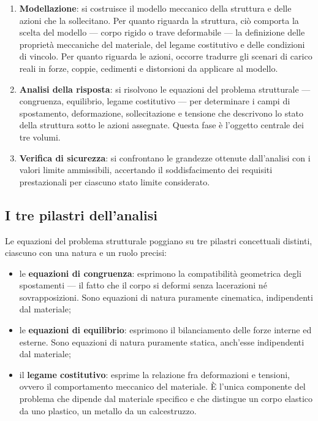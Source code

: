 \begin{enumerate}[nosep]
	\item \textbf{Modellazione}: si costruisce il modello meccanico della struttura e delle azioni che la sollecitano. Per quanto riguarda la struttura, ciò comporta la scelta del modello --- corpo rigido o trave deformabile --- la definizione delle proprietà meccaniche del materiale, del legame costitutivo e delle condizioni di vincolo. Per quanto riguarda le azioni, occorre tradurre gli scenari di carico reali in forze, coppie, cedimenti e distorsioni da applicare al modello.
	
	\item \textbf{Analisi della risposta}: si risolvono le equazioni del problema strutturale --- congruenza, equilibrio, legame costitutivo --- per determinare i campi di spostamento, deformazione, sollecitazione e tensione che descrivono lo stato della struttura sotto le azioni assegnate. Questa fase è l'oggetto centrale dei tre volumi.
	
	\item \textbf{Verifica di sicurezza}: si confrontano le grandezze ottenute dall'analisi con i valori limite ammissibili, accertando il soddisfacimento dei requisiti prestazionali per ciascuno stato limite considerato.
\end{enumerate}

\subsection{I tre pilastri dell'analisi}

Le equazioni del problema strutturale poggiano su tre pilastri concettuali distinti, ciascuno con una natura e un ruolo precisi:

\begin{itemize}[nosep]
	\item le \textbf{equazioni di congruenza}: esprimono la compatibilità geometrica degli spostamenti --- il fatto che il corpo si deformi senza lacerazioni né sovrapposizioni. Sono equazioni di natura puramente cinematica, indipendenti dal materiale;
	\item le \textbf{equazioni di equilibrio}: esprimono il bilanciamento delle forze interne ed esterne. Sono equazioni di natura puramente statica, anch'esse indipendenti dal materiale;
	\item il \textbf{legame costitutivo}: esprime la relazione fra deformazioni e tensioni, ovvero il comportamento meccanico del materiale. È l'unica componente del problema che dipende dal materiale specifico e che distingue un corpo elastico da uno plastico, un metallo da un calcestruzzo.
\end{itemize}


